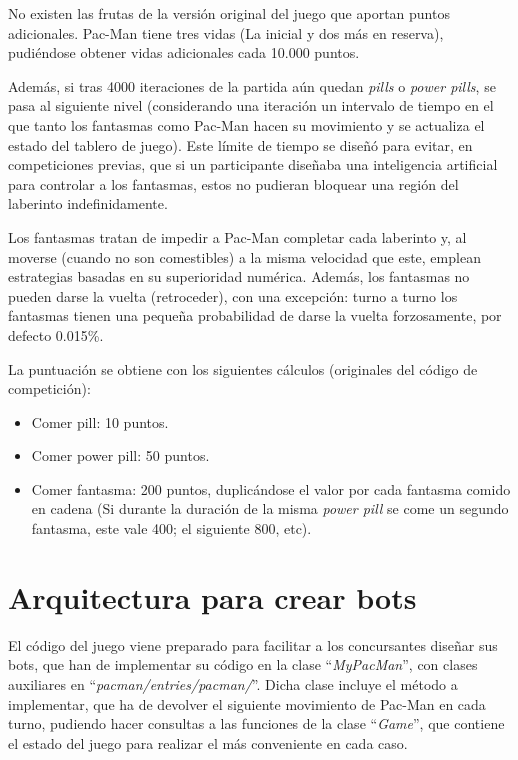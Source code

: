 No existen las frutas de la versión original del juego que aportan puntos adicionales.
Pac-Man tiene tres vidas (La inicial y dos más en reserva), pudiéndose obtener vidas adicionales cada 10.000 puntos.

Además, si tras 4000 iteraciones de la partida aún quedan \textit{pills} o \textit{power pills}, se pasa al siguiente nivel (considerando una iteración un intervalo de tiempo en el que tanto los fantasmas como Pac-Man hacen su movimiento y se actualiza el estado del tablero de juego). Este límite de tiempo se diseñó para evitar, en competiciones previas, que si un participante diseñaba una inteligencia artificial para controlar a los fantasmas, estos no pudieran bloquear una región del laberinto indefinidamente.
 
Los fantasmas tratan de impedir a Pac-Man completar cada laberinto y, al moverse (cuando no son comestibles) a la misma velocidad que este, emplean estrategias basadas en su superioridad numérica. Además, los fantasmas no pueden darse la vuelta (retroceder), con una excepción: turno a turno los fantasmas tienen una pequeña probabilidad de darse la vuelta forzosamente, por defecto 0.015\%.
 
La puntuación se obtiene con los siguientes cálculos (originales del código de competición):
\begin{itemize}
\item Comer pill: 10 puntos.
\item Comer power pill: 50 puntos.
\item Comer fantasma: 200 puntos, duplicándose el valor por cada fantasma comido en cadena (Si durante la duración de la misma \textit{power pill} se come un segundo fantasma, este vale 400; el siguiente 800, etc).
\end{itemize}

\section{Arquitectura para crear bots}
El código del juego viene preparado para facilitar a los concursantes diseñar sus bots, que han de implementar su código en la clase ``\textit{MyPacMan}'', con clases auxiliares en ``\textit{pacman/entries/pacman/}''. Dicha clase incluye el método a implementar, que ha de devolver el siguiente movimiento de Pac-Man en cada turno, pudiendo hacer consultas a las funciones de la clase ``\textit{Game}'', que contiene el estado del juego para realizar el más conveniente en cada caso.
 
